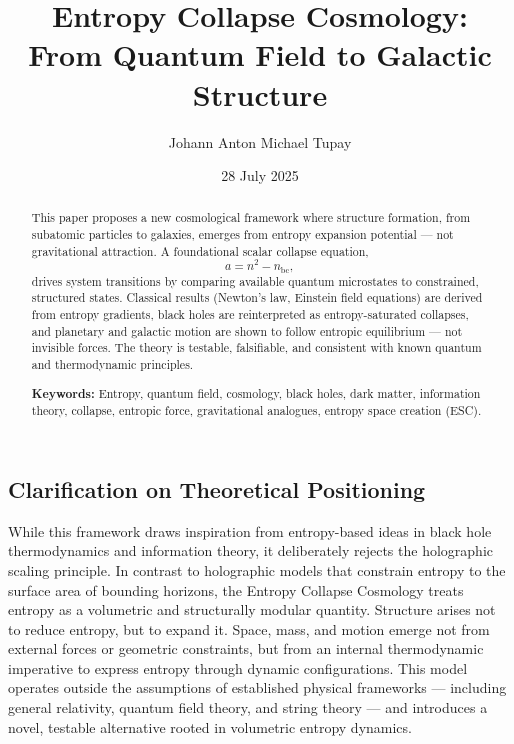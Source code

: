 \documentclass[12pt]{article}
\title{\textbf{Entropy Collapse Cosmology: \\ From Quantum Field to Galactic Structure}}
\author{Johann Anton Michael Tupay}
\affil{London, United Kingdom\\
\texttt{jamtupay@icloud.com}}
\date{28 July 2025}
\begin{document}
\maketitle

\vspace{-1.5em}
\begin{abstract}
\noindent
This paper proposes a new cosmological framework where structure formation, 
from subatomic particles to galaxies, emerges from entropy expansion potential 
— not gravitational attraction. A foundational scalar collapse equation,
\[
a = n^2 - n_{\text{bc}},
\]
drives system transitions by comparing available quantum
microstates to constrained, structured states. Classical results (Newton's law, 
Einstein field equations) are derived from entropy gradients, black holes are 
reinterpreted as entropy-saturated collapses, and planetary and galactic motion 
are shown to follow entropic equilibrium — not invisible forces. The theory is 
testable, falsifiable, and consistent with known quantum and thermodynamic principles.

\vspace{0.5em}
\noindent\textbf{Keywords:} Entropy, quantum field, cosmology, black holes, dark matter, information theory, collapse, entropic force, gravitational analogues, entropy space creation (ESC).
\end{abstract}

\vspace{1em}
\subsection*{Clarification on Theoretical Positioning}

While this framework draws inspiration from entropy-based ideas in black hole thermodynamics and information theory, it deliberately rejects the holographic scaling principle. In contrast to holographic models that constrain entropy to the surface area of bounding horizons, the Entropy Collapse Cosmology treats entropy as a volumetric and structurally modular quantity. Structure arises not to reduce entropy, but to expand it. Space, mass, and motion emerge not from external forces or geometric constraints, but from an internal thermodynamic imperative to express entropy through dynamic configurations. This model operates outside the assumptions of established physical frameworks — including general relativity, quantum field theory, and string theory — and introduces a novel, testable alternative rooted in volumetric entropy dynamics.
\end{document}
